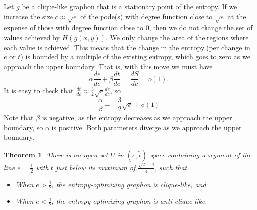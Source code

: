 \documentclass[12pt]{amsart}
\newcommand{\1}{\mathbf{1}}
\newtheorem{theorem}[lemma]{Theorem}
\begin{document}
Let $g$ be a clique-like graphon that is a stationary point of the entropy. If we increase the size $c \approx \sqrt{e}$ of the pode(s) with 
degree function close to $\sqrt{e}$ at the expense of those with degree function close to $0$, then we do not change the 
set of values achieved by $H(g(x,y))$. We only change the area of the regions where each value is achieved. This means that
the change in the entropy (per change in $e$ or $t$) is bounded by a multiple of the existing entropy, which goes to zero
as we approach the upper boundary. That is, with this move we must have
\begin{equation} \alpha \frac{de}{dc} + \beta \frac{dt}{dc} = \frac{dS}{dc} = o(1). \end{equation}
It is easy to check that $\frac{dt}{dc} \approx \frac32 \sqrt{e} \frac{de}{dc}$, so 
\begin{equation}\label{a-over-b} \frac{\alpha}{\beta} = -\frac32 \sqrt{e} + o(1) \end{equation}
Note that $\beta$ is negative, as the entropy decreases as we approach the upper boundary, so $\alpha$ is positive. Both parameters
diverge as we approach the upper boundary. 

\begin{theorem}\label{thmCliAnticli} There is an open set $U$ in $(e,
  \tilde t)$-space containing a segment of
the line $e=\frac12$ with $\tilde t$ just below its maximum of $\frac{\sqrt{2}-1}{4}$,
such that
\begin{itemize} 
\item When $e>\frac12$, the entropy-optimizing graphon is clique-like, and 
\item When $e < \frac12$, the entropy-optimizing graphon is anti-clique-like.  
\end{itemize}
\end{theorem}
\end{document}
